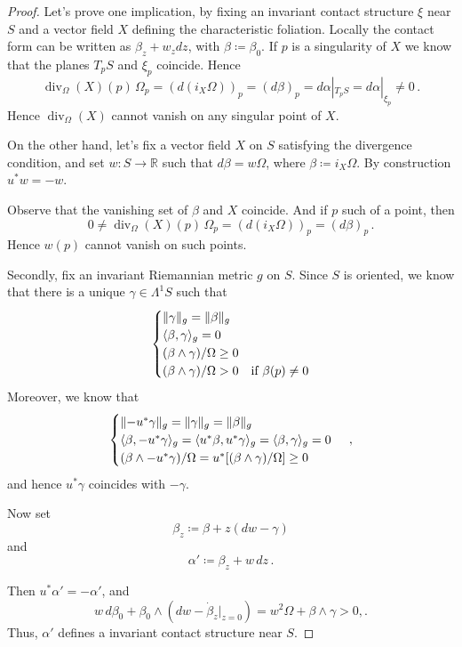 \documentclass[a4paper, 11pt]{amsart}
\theoremstyle{plain}
\theoremstyle{definition}
\newcommand{\R}{\mathbb{R}}
\DeclareMathOperator{\diver}{div}
\DeclarePairedDelimiter{\ang}{\langle}{\rangle}
\DeclarePairedDelimiter{\Abs}{\lVert}{\rVert}
\begin{document}
\begin{proof}
	Let's prove one implication, by fixing an invariant contact structure $\xi$ near $S$ and a vector field $X$ defining the characteristic foliation. Locally the contact form can be written as $\beta_z + w_zdz$, with $\beta \coloneqq \beta_0$. If $p$ is a singularity of $X$ we know that the planes $T_pS$ and $\xi_p$ coincide. Hence
	\[
		\diver_\Omega(X)(p)\,\Omega_p= (d(i_X\Omega))_p = (d\beta)_p = d\alpha|_{T_pS} = d\alpha|_{\xi_p} \neq 0\,.
	\] 
	Hence $\diver_\Omega(X)$ cannot vanish on any singular point of $X$.
	
	On the other hand, let's fix a vector field $X$ on $S$ satisfying the divergence condition, and set $w \colon S \to \R$ such that $d\beta = w\Omega$, where $\beta \coloneqq i_X\Omega$. By construction $u^*w = - w$.
	
	Observe that the vanishing set of $\beta$ and $X$ coincide. And if $p$ such of a point, then
	\[
		0 \neq \diver_\Omega(X)(p)\,\Omega_p = (d(i_X\Omega))_p = (d\beta)_p\,.
	\]
	Hence $w(p)$ cannot vanish on such points.
	
	Secondly, fix an invariant Riemannian metric $g$ on $S$. Since $S$ is oriented, we know that there is a unique $\gamma \in \Lambda^1S$ such that
	\[
	\begin{cases}
		\Abs{\gamma}_g = \Abs{\beta}_g\\
		\ang{\beta,\gamma}_g = 0\\
		(\beta \wedge \gamma)/\Omega \ge 0\\
		(\beta \wedge \gamma)/\Omega > 0 & \text{if $\beta(p) \neq 0$}
	\end{cases}
	\]
	Moreover, we know that 
	\[
	\begin{cases}
		\Abs{- u^*\gamma}_g = \Abs{\gamma}_g = \Abs{\beta}_g\\
		\ang{\beta, - u^*\gamma}_g = \ang{u^*\beta, u^*\gamma}_g = \ang{\beta,\gamma}_g = 0\\
		(\beta \wedge - u^*\gamma)/\Omega = u^*[(\beta \wedge \gamma)/\Omega] \ge 0
	\end{cases}\,,
	\]
	and hence $u^*\gamma$ coincides with $-\gamma$.
	
	Now set
	\[
		\beta_z \coloneqq \beta + z(dw - \gamma)
	\]
	and
	\[
		\alpha' \coloneqq \beta_z + w\,dz\,.
	\]
	
	Then $u^*\alpha' = - \alpha'$, and
	\[
		w\,d\beta_0 + \beta_0 \wedge (dw - \dot{\beta}_z|_{z = 0}) = w^2\Omega + \beta \wedge \gamma > 0,.
	\]
	Thus, $\alpha'$ defines a invariant contact structure near $S$.
\end{proof}
\end{document}
